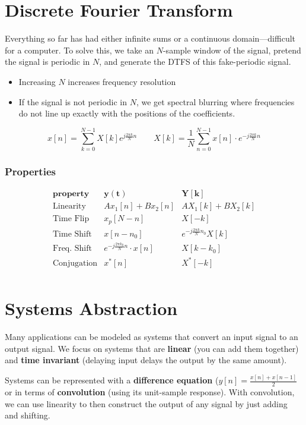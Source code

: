 \documentclass{article}
\begin{document}
\begin{multicols}{2}
\section{Discrete Fourier Transform}
Everything so far has had either infinite sums or a continuous domain---difficult for a computer. To solve this, we take an $N$-sample window of the signal, pretend the signal is periodic in $N$, and generate the DTFS of this fake-periodic signal. 
\begin{itemize}
	\item Increasing $N$ increases frequency resolution
	\item If the signal is not periodic in $N$, we get spectral blurring where frequencies do not line up exactly with the positions of the coefficients. 
\end{itemize}

\[ x[n] = \sum_{k=0}^{N-1} X[k] e^{j\frac{2\pi k}{N} n} \qquad X[k] = \frac{1}{N} \sum_{n=0}^{N-1} x[n]\cdot e^{-j\frac{2\pi k}{N} n} \]

\subsubsection{Properties}
\[ \begin{array}{rcc}
	\textbf{property} & \mathbf{y(t)} & \mathbf{Y[k]} \\
	\hline
	\text{Linearity} & Ax_1[n] + Bx_2[n] & AX_1[k] + BX_2[k] \\
	\text{Time Flip} & x_p[N-n] & X[-k] \\
	\text{Time Shift} & x[n-n_0] & e^{-j\frac{2\pi k}{N}n_0} X[k] \\
	\text{Freq. Shift} & e^{-j\frac{2\pi k_0}{N}n}\cdot x[n] & X[k-k_0] \\
	\text{Conjugation} & x^*[n] & X^*[-k] \\
\end{array} \]

\section{Systems Abstraction}
Many applications can be modeled as systems that convert an input signal to an output signal. We focus on systems that are \textbf{linear} (you can add them together) and \textbf{time invariant} (delaying input delays the output by the same amount). 

Systems can be represented with a \textbf{difference equation} ($y[n] = \frac{x[n] + x[n-1]}{2}$ or in terms of \textbf{convolution} (using its unit-sample response). With convolution, we can use linearity to then construct the output of any signal by just adding and shifting.


\end{multicols}
\end{document}
